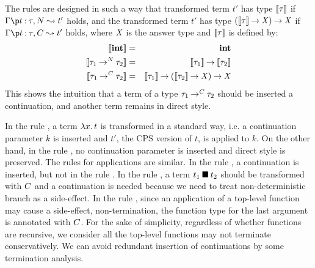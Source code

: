 The rules are designed in such a way that transformed term $t'$ has type
$[\![{\tau}]\!]$ if $\CPS{\Gamma}{t}{\tau}{N}{t'}$ holds, and the transformed
term $t'$ has type ${({[\![{\tau}]\!]}\mathbin{\rightarrow}{\mathit{X}})}\mathbin{\rightarrow}{\mathit{X}}$ if
$\CPS{\Gamma}{t}{\tau}{C}{t'}$ holds, where $\mathit{X}$ is the answer type and
$[\![{\tau}]\!]$ is defined by:
\begin{eqnarray*}
 \CPSty{\INT} &=& \INT \\
 \CPSty{\TFunN{\tau_1}{\tau_2}} &=& \TFun{\CPSty{\tau_1}}{\CPSty{\tau_2}} \\
 \CPSty{\TFunC{\tau_1}{\tau_2}} &=& \TFun{\CPSty{\tau_1}}{\TFun{(\TFun{\CPSty{\tau_2}}{\AT})}{\AT}}
\end{eqnarray*}
This shows the intuition that a term of a type ${\tau_1}\mathbin{\rightarrow^{C}}{\tau_2}$
should be inserted a continuation, and another term remains in direct
style.

In the rule , a term $\lambda{x}.\,{t}$ is transformed in a
standard way, i.e. a continuation parameter $k$ is inserted and $t'$,
the CPS version of $t$, is applied to $k$.  On the other hand, in the
rule , no continuation parameter is inserted and direct
style is preserved.  The rules for applications are similar. In the rule
, a continuation is inserted, but not in the rule
.  In the rule , a term ${t_1}\mathbin{\blacksquare}{t_2}$ should
be transformed with $C$ and a continuation is needed because we need to treat
non-deterministic branch as a side-effect.  In the rule ,
since an application of a top-level function may cause a side-effect,
non-termination, the function type for the last argument is annotated
with $C$.  For the sake of simplicity, regardless of whether functions
are recursive, we consider all the top-level functions may not terminate
conservatively.
We can avoid redundant insertion of continuations
by some termination analysis.


